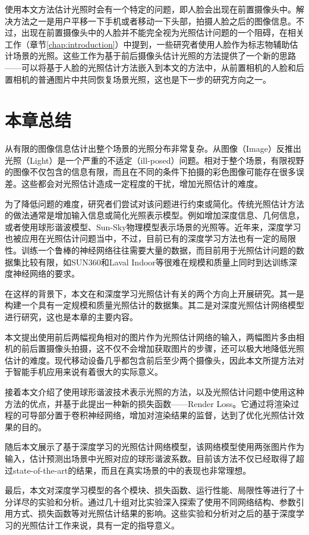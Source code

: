 使用本文方法估计光照时会有一个特定的问题，即人脸会出现在前置摄像头中。解决方法之一是用户平移一下手机或者移动一下头部，拍摄人脸之后的图像信息。不过，出现在前置摄像头中的人脸并不能完全视为光照估计问题的一个阻碍，在相关工作（章节\ref{chap:introduction}）中提到，一些研究者使用人脸作为标志物辅助估计场景的光照。这些工作为基于前后摄像头估计光照的方法提供了一个新的思路——可以将基于人脸的光照估计方法嵌入到本文的方法中，从前置相机的人脸和后置相机的普通图片中共同恢复场景光照，这也是下一步的研究方向之一。
\section{本章总结}
从有限的图像信息估计出整个场景的光照分布非常复杂。从图像（Image）反推出光照（Light）是一个严重的不适定（ill-posed）问题。相对于整个场景，有限视野的图像不仅包含的信息有限，而且在不同的条件下拍摄的彩色图像可能存在很多误差。这些都会对光照估计造成一定程度的干扰，增加光照估计的难度。

为了降低问题的难度，研究者们尝试对该问题进行约束或简化。传统光照估计方法的做法通常是增加输入信息或简化光照表示模型。例如增加深度信息、几何信息，或者使用球形谐波模型、Sun-Sky物理模型表示场景的光照等。近年来，深度学习也被应用在光照估计问题当中，不过，目前已有的深度学习方法也有一定的局限性。训练一个鲁棒的神经网络往往需要大量的数据，而目前用于光照估计问题的数据集比较有限，如SUN360\cite{xiao2012recognizing}和Laval Indoor\cite{gardner2017learning}等很难在规模和质量上同时到达训练深度神经网络的要求。

在这样的背景下，本文在和深度学习光照估计有关的两个方向上开展研究。其一是构建一个具有一定规模和质量光照估计的数据集。其二是对深度光照估计网络模型进行研究，这也是本章的主要内容。

本文提出使用前后两幅视角相对的图片作为光照估计网络的输入，两幅图片多由相机的前后置摄像头拍摄，这不仅不会增加获取图片的步骤，还可以极大地降低光照估计的难度。现代移动设备几乎都包含前后至少两个摄像头，因此本文所提方法对于智能手机应用来说有着很大的实际意义。

接着本文介绍了使用球形谐波技术表示光照的方法，以及光照估计问题中使用这种方法的优点，并基于此提出一种新的损失函数——Render Loss。它通过将渲染过程的可导部分置于卷积神经网络，增加对渲染结果的监督，达到了优化光照估计效果的目的。

随后本文展示了基于深度学习的光照估计网络模型，该网络模型使用两张图片作为输入，估计预测出场景中光照对应的球形谐波系数。目前该方法不仅已经取得了超过state-of-the-art的结果，而且在真实场景的中的表现也非常理想。

最后，本文对深度学习模型的各个模块、损失函数、运行性能、局限性等进行了十分详尽的实验和分析。通过几十组对比实验深入探索了使用不同网络结构、参数引用方式、损失函数等对光照估计结果的影响。这些实验和分析对之后的基于深度学习的光照估计工作来说，具有一定的指导意义。
